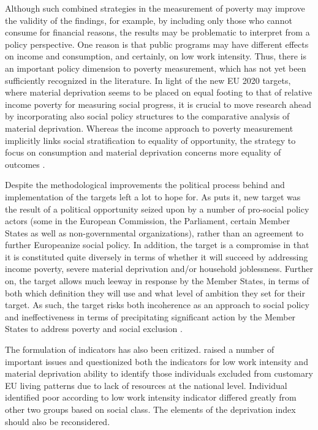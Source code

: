\documentclass[11pt, a4paper]{article}\usepackage{graphicx, color}
\begin{document}
Although such combined strategies in the measurement of poverty may improve the validity of the findings, for example, by including only those who cannot consume for financial reasons, the results may be problematic to interpret from a policy perspective. One reason is that public programs may have different effects on income and consumption, and certainly, on low work intensity. Thus, there is an important policy dimension to poverty measurement, which has not yet been sufficiently recognized in the literature. In light of the new EU 2020 targets, where material deprivation seems to be placed on equal footing to that of relative income poverty for measuring social progress, it is crucial to move research ahead by incorporating also social policy structures to the comparative analysis of material deprivation. Whereas the income approach to poverty measurement implicitly links social stratification to equality of opportunity, the strategy to focus on consumption and material deprivation concerns more equality of outcomes \citep{ringen1988direct}.


Despite the methodological improvements the political process behind and implementation of the targets left a lot to hope for. As \citet{copeland_varieties_2012} puts it, new target was the result of a political opportunity seized upon by a number of pro-social policy actors (some in the European Commission, the Parliament, certain Member States as well as non-governmental organizations), rather than an agreement to further Europeanize social policy. In addition, the target is a compromise in that it is constituted quite diversely in terms of whether it will succeed by addressing income poverty, severe material deprivation and/or household joblessness. Further on, the target allows much leeway in response by the Member States, in terms of both which definition they will use and what level of ambition they set for their target. As such, the target risks both incoherence as an approach to social policy and ineffectiveness in terms of precipitating significant action by the Member States to address poverty and social exclusion \citep{copeland_varieties_2012}.

The formulation of indicators has also been critized. \citet{nolan_eu_2011} raised a number of important issues and questionized both the indicators for low work intensity and material deprivation ability to identify those individuals excluded from customary EU living patterns due to lack of resources at the national level. Individual identified poor according to low work intensity indicator differed greatly from other two groups based on social class. The elements of the deprivation index should also be reconsidered.
\end{document}
